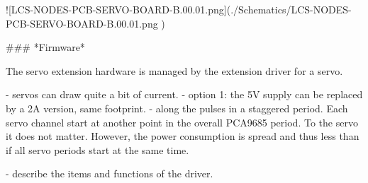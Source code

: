 ![LCS-NODES-PCB-SERVO-BOARD-B.00.01.png](./Schematics/LCS-NODES-PCB-SERVO-BOARD-B.00.01.png )

### *Firmware*

The servo extension hardware is managed by the extension driver for a servo.

- servos can draw quite a bit of current.
- option 1: the 5V supply can be replaced by a 2A version, same footprint.
- along the pulses in a staggered period. Each servo channel start at another point in the overall PCA9685 period. To the servo it does not matter. However, the power consumption is spread and thus less than if all servo periods start at the same time.

- describe the items and functions of the driver.

